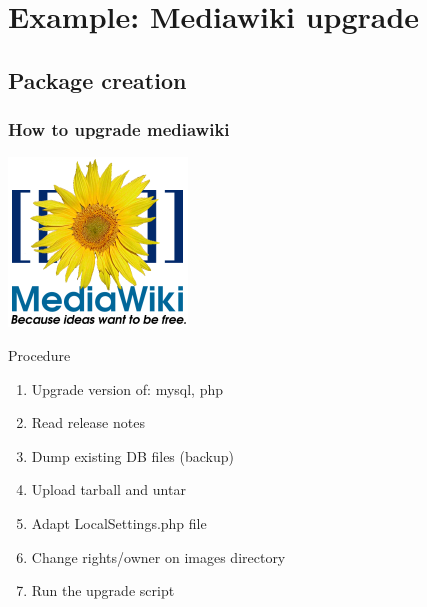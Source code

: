 \documentclass[11pt,compress]{beamer}
\begin{document}
\section{Example: Mediawiki upgrade}
\subsection{Package creation}
\begin{frame}
\frametitle{How to upgrade mediawiki}
\begin{center}
\includegraphics[scale=0.2]{figures/mw}
\end{center}
\begin{block}{Procedure}
\begin{enumerate}
\item Upgrade version of: mysql, php
\item Read release notes
\item Dump existing DB files (backup)
\item Upload tarball and untar
\item Adapt LocalSettings.php file
\item Change rights/owner on images directory
\item Run the upgrade script
\end{enumerate}
\end{block}
\end{frame}
\end{document}
